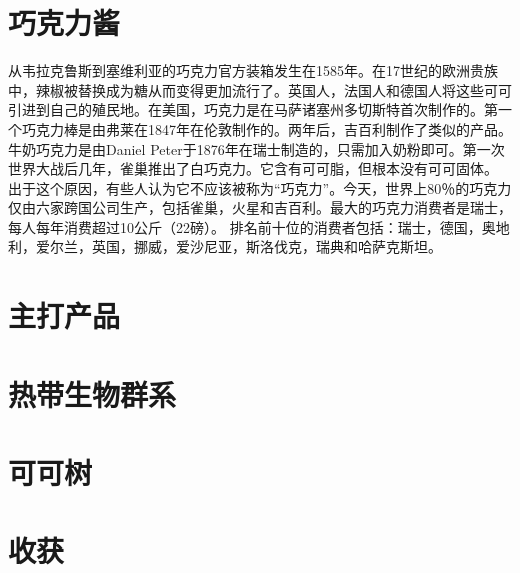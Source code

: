 \section{巧克力酱}
     从韦拉克鲁斯到塞维利亚的巧克力官方装箱发生在1585年。在17世纪的欧洲贵族中，辣椒被替换成为糖从而变得更加流行了。英国人，法国人和德国人将这些可可引进到自己的殖民地。在美国，巧克力是在马萨诸塞州多切斯特首次制作的。第一个巧克力棒是由弗莱在1847年在伦敦制作的。两年后，吉百利制作了类似的产品。 牛奶巧克力是由Daniel Peter于1876年在瑞士制造的，只需加入奶粉即可。第一次世界大战后几年，雀巢推出了白巧克力。它含有可可脂，但根本没有可可固体。 出于这个原因，有些人认为它不应该被称为“巧克力”。今天，世界上80％的巧克力仅由六家跨国公司生产，包括雀巢，火星和吉百利。最大的巧克力消费者是瑞士，每人每年消费超过10公斤（22磅）。 排名前十位的消费者包括：瑞士，德国，奥地利，爱尔兰，英国，挪威，爱沙尼亚，斯洛伐克，瑞典和哈萨克斯坦。


\section{主打产品}
      




\section{热带生物群系}



\section{可可树}


\section{收获}



\section{}
